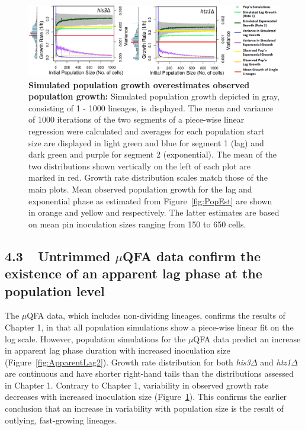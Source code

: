 \documentclass{bioinfo}
\begin{document}
{\setcounter{figure}{18}
\begin{figure}[hb!]
\centering
\includegraphics[width=1\linewidth]{Ch2MeanVar2.png}
\vspace{-2em}
\caption{\footnotesize{\textbf{Simulated population growth overestimates observed population growth:} Simulated population growth depicted in gray, consisting of 1 - 1000 lineages, is displayed. The mean and variance of 1000 iterations of the two segments of a piece-wise linear regression were calculated and averages for each population start size are displayed in light green and blue for segment 1 (lag) and dark green and purple for segment 2 (exponential). The mean of the two distributions shown vertically on the left of each plot are marked in red. Growth rate distribution scales match those of the main plots. Mean observed population growth for the lag and exponential phase as estimated from Figure~\ref{fig:PopEst} are shown in orange and yellow and respectively. The latter estimates are based on mean pin inoculation sizes ranging from 150 to 650 cells.}}
\label{fig:MeanVar2}
\vspace{-2em}
\end{figure}

\vspace{-0.5em}
\subsection*{4.3 $\>\>$ Untrimmed $\mu$QFA data confirm the existence of an apparent lag phase at the population level}

The $\mu$QFA data, which includes non-dividing lineages, confirms the results of Chapter 1, in that all population simulations show a piece-wise linear fit on the log scale. However, population simulations for the $\mu$QFA data predict an increase in apparent lag phase duration with increased inoculation size (Figure~\ref{fig:ApparentLag2}). Growth rate distribution for both \textit{his3}$\Delta$ and \textit{htz1}$\Delta$ are continuous and have shorter right-hand tails than the distributions assessed in Chapter 1. Contrary to Chapter 1, variability in observed growth rate decreases with increased inoculation size (Figure~\ref{fig:MeanVar2}). This confirms the earlier conclusion that an increase in variability with population size is the result of outlying, fast-growing lineages. 

}
\end{document}
